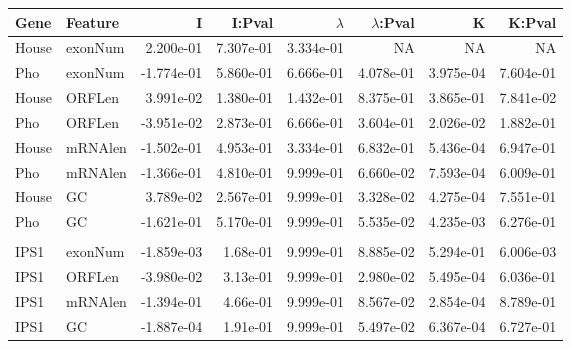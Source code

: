 \documentclass[varwidth,convert]{standalone}
\begin{document}
\bigbreak

\begin{tabular}{llrrrrrr}
\toprule
Gene & Feature & I & I:Pval & $\lambda$ & $\lambda$:Pval & K & K:Pval \\ 
\midrule
House & exonNum & 2.200e-01 & 7.307e-01 & 3.334e-01 &        NA &        NA &        NA \\ 
Pho & exonNum & -1.774e-01 &  5.860e-01 &  6.666e-01 &  4.078e-01 &  3.975e-04 &  7.604e-01 \\ 
House & ORFLen & 3.991e-02 & 1.380e-01 & 1.432e-01 & 8.375e-01 & 3.865e-01 & 7.841e-02 \\ 
Pho & ORFLen & -3.951e-02 &  2.873e-01 &  6.666e-01 &  3.604e-01 &  2.026e-02 &  1.882e-01 \\ 
House & mRNAlen & -1.502e-01 &  4.953e-01 &  3.334e-01 &  6.832e-01 &  5.436e-04 &  6.947e-01 \\ 
Pho & mRNAlen & -1.366e-01 &  4.810e-01 &  9.999e-01 &  6.660e-02 &  7.593e-04 &  6.009e-01 \\ 
House & GC & 3.789e-02 & 2.567e-01 & 9.999e-01 & 3.328e-02 & 4.275e-04 & 7.551e-01 \\ 
Pho & GC & -1.621e-01 &  5.170e-01 &  9.999e-01 &  5.535e-02 &  4.235e-03 &  6.276e-01 \\ 
\\
IPS1 & exonNum & -1.859e-03 & 1.68e-01 & 9.999e-01 & 8.885e-02 & 5.294e-01 & 6.006e-03 \\ 
IPS1 & ORFLen & -3.980e-02 & 3.13e-01 & 9.999e-01 & 2.980e-02 & 5.495e-04 & 6.036e-01 \\ 
IPS1 & mRNAlen & -1.394e-01 & 4.66e-01 & 9.999e-01 & 8.567e-02 & 2.854e-04 & 8.789e-01 \\ 
IPS1 & GC & -1.887e-04 & 1.91e-01 & 9.999e-01 & 5.497e-02 & 6.367e-04 & 6.727e-01 \\ 
\bottomrule

\end{tabular}
\end{document}
